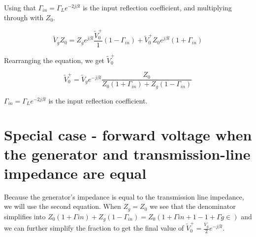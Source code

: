 \documentclass{ximera}
\begin{document}
Using that 
 $\Gamma_{in} = \Gamma_L e^{-2 j \beta l} $ is the input reflection coefficient, and multiplying through with $Z_0$.


\begin{equation}
\tilde{V}_g Z_0=Z_g e^{j \beta l} \frac{\tilde{V}_0^+}{1}  (1 - \Gamma_{in} ) + \tilde{V}_0^+ Z_0 e^{j \beta l} (1 + \Gamma_{in}) 
\end{equation}


Rearranging the equation, we get $\tilde{V}_0^+$

\begin{equation}
\tilde{V}_0^+=\tilde{V}_g e^{-j \beta l} \frac{Z_0}{Z_0 (1+\Gamma_{in}) +Z_g (1-\Gamma_{in})}
\end{equation}

 $\Gamma_{in} = \Gamma_L e^{-2 j \beta l} $ is the input reflection coefficient.



\section{Special case - forward voltage when the generator and transmission-line impedance are equal}

Because the generator's impedance is equal to the transmission line impedance, we will use the second equation. When $Z_g=Z_0$ we see that the denominator simplifies into $Z_0 (1+\Gamma{in}) +Z_g (1-\Gamma_{in}) = Z_0 (1+\Gamma{in}+1-1+\Gamma{g\in})$ and we can further simplify the fraction to get the final value of $\tilde{V}_0^+=\frac{V_g}{2} e^{-j \beta l}$. 
\end{document}
